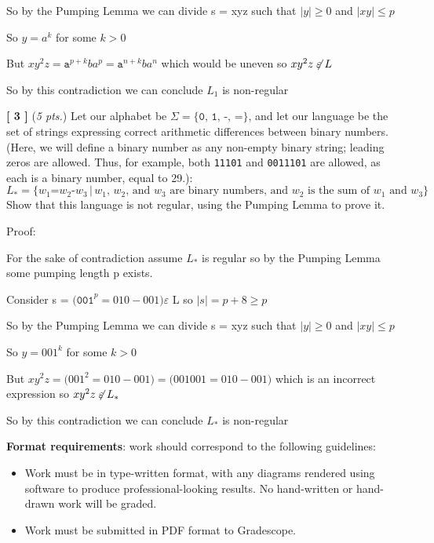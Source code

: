 \documentclass[leqno,11pt]{article}
\newcommand{\set}[1]%
	{\ensuremath{ \{ #1 \} }}
\newcommand{\suth}{\ensuremath{ \,|\, }}
\newcommand{\qn}[1]%
	{\noindent \textbf{[ #1 ]}\quad}
\begin{document}
So by the Pumping Lemma we can divide s = xyz such that ${|y| \geq 0}$ and ${|xy| \leq p}$

So ${y = a^k}$ for some ${k > 0}$

But ${xy^2z = \texttt{a}^{p+k}{b}{a}^p = \texttt{a}^{n+k}{b}{a}^n }$ which would be uneven so ${xy^2z \not\mathrel{\varepsilon} L}$

So by this contradiction we can conclude $L_1$ is non-regular 

\vspace{16pt}

\qn{3} (\emph{5 pts.}) Let our alphabet be $\Sigma = \set{ \texttt{0},\, \texttt{1},\, \texttt{-},\, \texttt{=}}$,
and let our language be the set of strings expressing correct arithmetic differences between binary numbers.
(Here, we will define a binary number as any non-empty binary string; leading zeros are allowed.  Thus, for
example, both \texttt{11101} and \texttt{0011101} are allowed, as each is a binary number, equal to 29.):
\[
	L_{*} = \set{w_1 \texttt{=} w_2 \texttt{-} w_3 \suth \text{$w_1$, $w_2$, and $w_3$ are binary numbers, and
	$w_2$ is the sum of $w_1$ and $w_3$}}
\]
Show that this language is not regular, using the Pumping Lemma to prove it.

Proof:

For the sake of contradiction assume $L_{*}$ is regular so by the Pumping Lemma some pumping length p exists.

Consider s = ${\texttt{(001}^p=010-001)}\varepsilon$ L so ${|s| = p + 8 \geq p}$


So by the Pumping Lemma we can divide s = xyz such that ${|y| \geq 0}$ and ${|xy| \leq p}$

So ${y = 001^k}$ for some ${k > 0}$

But ${xy^2z = \texttt({001}^2=010-001)= \texttt(001001=010-001)}$ which is an incorrect expression so ${xy^2z \not\mathrel{\varepsilon} L_{*}}$

So by this contradiction we can conclude $L_{*}$ is non-regular 


 \pagebreak 

\noindent 
\textbf{Format requirements}: work should correspond to the following guidelines:
\begin{itemize}  

	\item Work must be in type-written format, with any diagrams rendered using software to produce
		professional-looking results.  No hand-written or hand-drawn work will be graded.
		
	\item Work must be submitted in PDF format to Gradescope.

\end{itemize}
\end{document}
